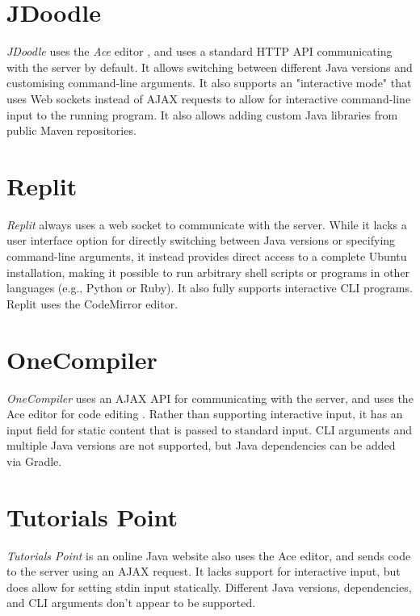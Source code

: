 \section{JDoodle}

\emph{JDoodle} \cite{nutpan-pty-ltd-2022} uses the \emph{Ace} editor \cite{mozilla-2022}, and uses a standard HTTP API communicating with the server by default. It allows switching between different Java versions and customising command-line arguments. It also supports an "interactive mode" that uses Web sockets instead of AJAX requests to allow for interactive command-line input to the running program. It also allows adding custom Java libraries from public Maven repositories.


\section{Replit}

\emph{Replit} \cite{replit-2022} always uses a web socket to communicate with the server. While it lacks a user interface option for directly switching between Java versions or specifying command-line arguments, it instead provides direct access to a complete Ubuntu installation, making it possible to run arbitrary shell scripts or programs in other languages (e.g., Python or Ruby). It also fully supports interactive CLI programs. Replit uses the CodeMirror editor.


\section{OneCompiler}

\emph{OneCompiler} uses an AJAX API for communicating with the server, and uses the Ace editor for code editing \cite{one-compiler-pvt-ltd-2022}. Rather than supporting interactive input, it has an input field for static content that is passed to standard input. CLI arguments and multiple Java versions are not supported, but Java dependencies can be added via Gradle.


\section{Tutorials Point}

\emph{Tutorials Point} \cite{tutorials-point-2022} is an online Java website also uses the Ace editor, and sends code to the server using an AJAX request. It lacks support for interactive input, but does allow for setting stdin input statically. Different Java versions, dependencies, and CLI arguments don't appear to be supported.


